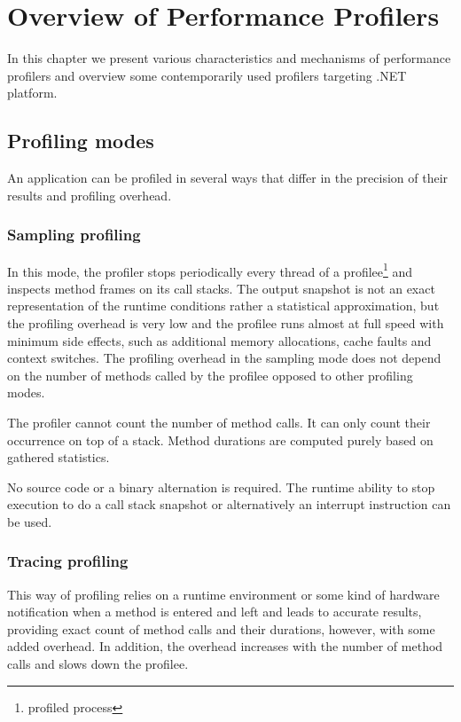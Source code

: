 \chapter{Overview of Performance Profilers}

In this chapter we present various characteristics and mechanisms of performance profilers and overview some contemporarily used profilers targeting .NET platform.

\label{01ProfModes}
\section{Profiling modes}
An application can be profiled in several ways that differ in the precision of their results and profiling overhead. 

\subsection{Sampling profiling}
In this mode, the profiler stops periodically every thread of a profilee\footnote{profiled process} and inspects method frames on its call stacks. The output snapshot is not an exact representation of the runtime conditions rather a statistical approximation, but the profiling overhead is very low and the profilee runs almost at full speed with minimum side effects, such as additional memory allocations, cache faults and context switches. The profiling overhead in the sampling mode does not depend on the number of methods called by the profilee opposed to other profiling modes. 

The profiler cannot count the number of method calls. It can only count their occurrence on top of a stack. Method durations are computed purely based on gathered statistics. 

No source code or a binary alternation is required. The runtime ability to stop execution to do a call stack snapshot or alternatively an interrupt instruction can be used.

\subsection{Tracing profiling}
This way of profiling relies on a runtime environment or some kind of hardware notification when a method is entered and left and leads to accurate results, providing exact count of method calls and their durations, however, with some added overhead. In addition, the overhead increases with the number of method calls and slows down the profilee.

